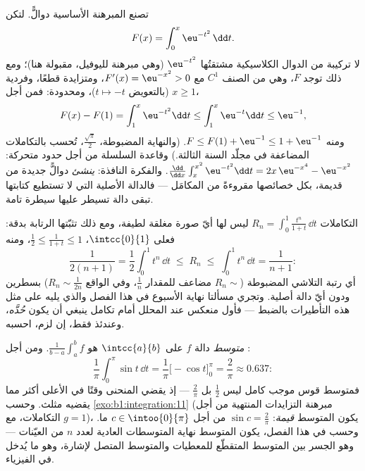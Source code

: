 \begin{example}\label{ex:b1:integration:definedby}
تصنع المبرهنة الأساسية دوالًّ. لتكن
\[
F(x) = \int_0^x \eu^{-t^2}\,\dd t .
\]
لا تركيبة من الدوال الكلاسيكية مشتقتُها
$\eu^{-t^2}$ (وهي مبرهنة لليوفيل، مقبولة هنا)؛ ومع ذلك توجد $F$،
وهي من الصنف $C^1$ مع $F'(x) = \eu^{-x^2} > 0$، ومتزايدة قطعًا، وفردية
(بالتعويض $t \mapsto -t$)، ومحدودة: فمن أجل $x \geq 1$،
\[
F(x) - F(1) = \int_1^x \eu^{-t^2}\dd t
\leq \int_1^x \eu^{-t}\dd t \leq \eu^{-1} ,
\]
ومنه $F \leq F(1) + \eu^{-1} \leq 1 + \eu^{-1}$. (والنهاية المضبوطة،
$\frac{\sqrt\pi}{2}$، تُحسب بالتكاملات المضاعفة في
مجلّد السنة الثالثة.) وقاعدة السلسلة من أجل حدود متحركة: $\frac{\dd}{\dd
x}\int_x^{x^2} \eu^{-t^2}\dd t = 2x\,\eu^{-x^4} - \eu^{-x^2}$.
والفكرة النافذة:  \emph{ينشئ} دوالًّ جديدة
من قديمة، بكل خصائصها مقروءةً من
المكامَل --- فالدالة الأصلية التي لا تستطيع كتابتها تبقى
دالة تسيطر عليها سيطرة تامة.
\end{example}

\begin{example}\label{ex:b1:integration:estimate}
التكاملات $R_n = \int_0^1 \frac{t^n}{1 + t}\,\dd t$ ليس لها أيّ صورة
مغلقة لطيفة، ومع ذلك تثبّتها الرتابة بدقة: فعلى
$\intcc{0}{1}$، $\frac12 \leq \frac{1}{1+t} \leq 1$، ومنه
\[
\frac{1}{2(n+1)} = \frac12\int_0^1 t^n\,\dd t
\;\leq\; R_n \;\leq\; \int_0^1 t^n \,\dd t = \frac{1}{n+1} :
\]
أي رتبة التلاشي المضبوطة ($R_n \sim$ مضاعف للمقدار $\frac1n$،
وفي الواقع $R_n \sim \frac{1}{2n}$) بسطرين ودون أيّ
دالة أصلية. وتجري مسألتا نهاية الأسبوع في هذا الفصل والذي
يليه على مثل هذه التأطيرات بالضبط --- فأول منعكس عند المحلل
أمام تكامل ينبغي أن يكون \emph{حُدَّه}، وعندئذ
فقط، إن لزم، احسبه.
\end{example}

\begin{example}\label{ex:b1:integration:average}
\emph{متوسط} دالة  $f$ على $\intcc{a}{b}$ هو
$\frac{1}{b-a}\int_a^b f$. ومن أجل :
\[
\frac{1}{\pi}\int_0^\pi \sin t\,\dd t
= \frac{1}{\pi}\bigl[-\cos t\bigr]_0^\pi = \frac{2}{\pi}
\approx 0.637 :
\]
فمتوسط قوس موجب كامل ليس $\frac12$ بل
$\frac2\pi$ --- إذ يقضي المنحنى وقتًا في الأعلى أكثر مما يقضيه
مثلث. وحسب \cref{exo:b1:integration:11} (مبرهنة التزايدات المنتهية
من أجل التكاملات، مع $g = 1$)، يكون المتوسط \emph{قيمة}: $\sin c =
\frac2\pi$ من أجل $c \in \intoo{0}{\pi}$ ما. وحسب 
في هذا الفصل، يكون المتوسط نهاية المتوسطات
العادية لعدد $n$ من العيّنات --- وهو الجسر بين المتوسط
المتقطّع للمعطيات والمتوسط المتصل لإشارة، وهو ما
يُدخل  في الفيزياء.
\end{example}

